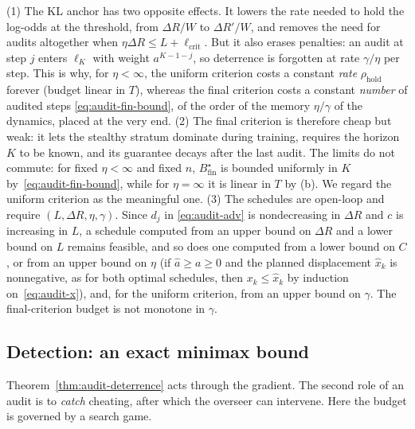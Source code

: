\begin{remark}\label{rem:audit-criteria}
(1) The KL anchor has two opposite effects. It lowers the rate needed to hold
the log-odds at the threshold, from $\Delta R/W$ to $\Delta R'/W$, and removes
the need for audits altogether when $\eta\Delta R\le L+\ell_{\mathrm{crit}}$.
But it also erases penalties: an audit at step $j$ enters $\ell_K$ with weight
$a^{K-1-j}$, so deterrence is forgotten at rate $\gamma/\eta$ per step. This is
why, for $\eta<\infty$, the uniform criterion costs a constant \emph{rate}
$\rho_{\mathrm{hold}}$ forever (budget linear in $T$), whereas the final
criterion costs a constant \emph{number} of audited steps
\eqref{eq:audit-fin-bound}, of the order of the memory $\eta/\gamma$ of the
dynamics, placed at the very end. (2) The final criterion is therefore cheap
but weak: it lets the stealthy stratum dominate during training, requires the
horizon $K$ to be known, and its guarantee decays after the last audit. The
limits do not commute: for fixed $\eta<\infty$ and fixed $n$, $B^\star_{\mathrm{fin}}$ is bounded uniformly in $K$ by~\eqref{eq:audit-fin-bound}, while for $\eta=\infty$ it is linear in $T$ by (b). We regard the
uniform criterion as the meaningful one. (3) The schedules are open-loop and
require $(L,\Delta R,\eta,\gamma)$. Since $d_j$ in \eqref{eq:audit-adv} is
nondecreasing in $\Delta R$ and $c$ is increasing in $L$, a schedule computed
from an upper bound on $\Delta R$ and a lower bound on $L$ remains feasible, and so does one computed from a lower bound on $C$, or from an upper bound on $\eta$ (if $\hat a\ge a\ge0$ and the planned displacement $\hat x_k$ is nonnegative, as for both optimal schedules, then $x_k\le\hat x_k$ by induction on~\eqref{eq:audit-x}), and, for the uniform criterion, from an upper bound on $\gamma$. The final-criterion budget is not monotone in $\gamma$.
\end{remark}

\subsection{Detection: an exact minimax bound}

Theorem~\ref{thm:audit-deterrence} acts through the gradient. The second role
of an audit is to \emph{catch} cheating, after which the overseer can
intervene. Here the budget is governed by a search game.


